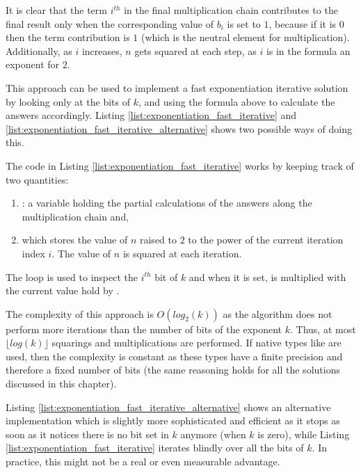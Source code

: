 It is clear that the term $i^{th}$ in the final multiplication chain contributes to the final result only when the corresponding value of $b_i$ is set to $1$, because if it is $0$ then the term contribution is $1$ (which is the neutral element for multiplication).
Additionally, as $i$ increases, $n$ gets squared at each step, as $i$ is in the formula an exponent for $2$. 


This approach can be used to implement
a fast exponentiation iterative solution by looking only at the bits of $k$, and using the formula above to calculate the answers accordingly.
Listing \ref{list:exponentiation_fast_iterative} and \ref{list:exponentiation_fast_iterative_alternative} shows two  possible ways of doing this.




The code in Listing \ref{list:exponentiation_fast_iterative}  works by keeping track of two quantities:
\begin{enumerate}
    \item {}: a variable holding the partial calculations of the answers along the multiplication chain and, 
    \item {} which stores the value of $n$ raised to $2$ to the power of the current iteration index $i$. The value of $n$ is squared at each iteration.
\end{enumerate}
The loop is used to inspect the $i^{th}$ bit of $k$ and when it is set,  is multiplied with the current value hold by . 


The complexity of this approach is $O(log_2(k))$ as the algorithm does not perform more iterations than the number of bits of the exponent $k$.
Thus, at most $\lfloor log(k) \rfloor$ squarings and multiplications are performed.
If native types like  are used, then the complexity is constant as these types have a finite precision and therefore a fixed number of bits (the same reasoning holds for all the solutions discussed in this chapter). 

Listing \ref{list:exponentiation_fast_iterative_alternative} shows an alternative implementation which is slightly more sophisticated and efficient as it stops as soon as it notices there is no bit set in $k$ anymore (when $k$ is zero),  while Listing \ref{list:exponentiation_fast_iterative} iterates blindly over all the bits of $k$.
In practice, this might not be a real or even measurable advantage.

